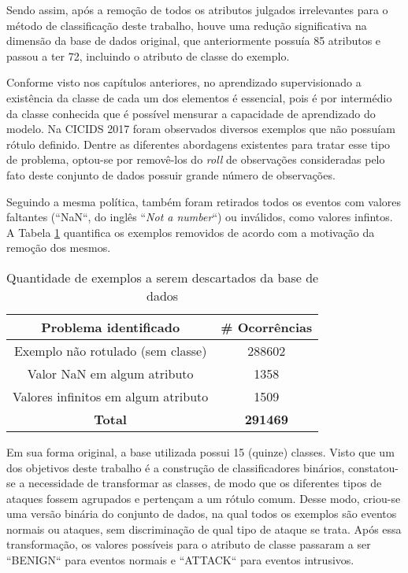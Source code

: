 Sendo assim, após a remoção de todos os atributos julgados irrelevantes para o método de classificação deste trabalho, houve uma redução significativa na dimensão da base de dados original, que anteriormente possuía 85 atributos e passou a ter 72, incluindo o atributo de classe do exemplo.

Conforme visto nos capítulos anteriores, no aprendizado supervisionado a existência da classe de cada um dos elementos é essencial, pois é por intermédio da classe conhecida que é possível mensurar a capacidade de aprendizado do modelo. Na CICIDS 2017 foram observados diversos exemplos que não possuíam rótulo definido. Dentre as diferentes abordagens existentes para tratar esse tipo de problema, optou-se por removê-los do \textit{roll} de observações consideradas pelo fato deste conjunto de dados possuir grande número de observações.

Seguindo a mesma política, também foram retirados todos os eventos com valores faltantes (``NaN``, do inglês ``\textit{Not a number}``) ou inválidos, como valores infintos. A Tabela \ref{tab:remocao-exemplos} quantifica os exemplos removidos de acordo com a motivação da remoção dos mesmos.

\begin{table}[H]
    \centering
    \begin{tabular}{cc}
        \hline
        \textbf{Problema identificado} & \textbf{\# Ocorrências} \\
        \hline
        Exemplo não rotulado (sem classe) & 288602 \\
        Valor NaN em algum atributo & 1358 \\
        Valores infinitos em algum atributo & 1509 \\
        \hline
        \textbf{Total} & \textbf{291469} \\
    \end{tabular} 
    \caption{Quantidade de exemplos a serem descartados da base de dados}
    \label{tab:remocao-exemplos}
\end{table}

Em sua forma original, a base utilizada possui 15 (quinze) classes. Visto que um dos objetivos deste trabalho é a construção de classificadores binários, constatou-se a necessidade de transformar as classes, de modo que os diferentes tipos de ataques fossem agrupados e pertençam a um rótulo comum. Desse modo, criou-se uma versão binária do conjunto de dados, na qual todos os exemplos são eventos normais ou ataques, sem discriminação de qual tipo de ataque se trata. Após essa transformação, os valores possíveis para o atributo de classe passaram a ser ``BENIGN`` para eventos normais e ``ATTACK`` para eventos intrusivos.

